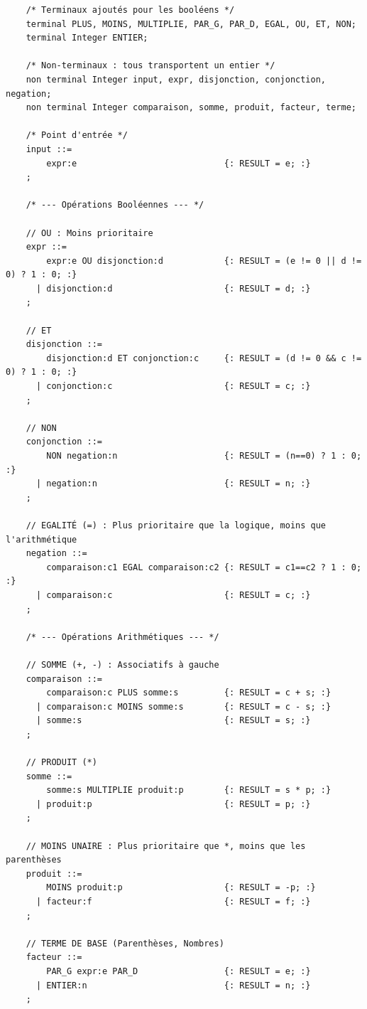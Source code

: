 \documentclass{td}
\begin{document}
\begin{correction}
  \begin{lstlisting}
    /* Terminaux ajoutés pour les booléens */
    terminal PLUS, MOINS, MULTIPLIE, PAR_G, PAR_D, EGAL, OU, ET, NON;
    terminal Integer ENTIER;
     
    /* Non-terminaux : tous transportent un entier */
    non terminal Integer input, expr, disjonction, conjonction, negation;
    non terminal Integer comparaison, somme, produit, facteur, terme;
          
    /* Point d'entrée */
    input ::=
        expr:e                             {: RESULT = e; :}
    ;
     
    /* --- Opérations Booléennes --- */
     
    // OU : Moins prioritaire
    expr ::=
        expr:e OU disjonction:d            {: RESULT = (e != 0 || d != 0) ? 1 : 0; :}
      | disjonction:d                      {: RESULT = d; :}
    ;
     
    // ET
    disjonction ::=
        disjonction:d ET conjonction:c     {: RESULT = (d != 0 && c != 0) ? 1 : 0; :}
      | conjonction:c                      {: RESULT = c; :}
    ;
     
    // NON
    conjonction ::=
        NON negation:n                     {: RESULT = (n==0) ? 1 : 0; :}
      | negation:n                         {: RESULT = n; :}
    ;
     
    // EGALITÉ (=) : Plus prioritaire que la logique, moins que l'arithmétique
    negation ::=
        comparaison:c1 EGAL comparaison:c2 {: RESULT = c1==c2 ? 1 : 0; :}
      | comparaison:c                      {: RESULT = c; :}
    ;
     
    /* --- Opérations Arithmétiques --- */
     
    // SOMME (+, -) : Associatifs à gauche
    comparaison ::=
        comparaison:c PLUS somme:s         {: RESULT = c + s; :}
      | comparaison:c MOINS somme:s        {: RESULT = c - s; :}
      | somme:s                            {: RESULT = s; :}
    ;
     
    // PRODUIT (*)
    somme ::=
        somme:s MULTIPLIE produit:p        {: RESULT = s * p; :}
      | produit:p                          {: RESULT = p; :}
    ;
     
    // MOINS UNAIRE : Plus prioritaire que *, moins que les parenthèses
    produit ::=
        MOINS produit:p                    {: RESULT = -p; :}
      | facteur:f                          {: RESULT = f; :}
    ;
     
    // TERME DE BASE (Parenthèses, Nombres)
    facteur ::=
        PAR_G expr:e PAR_D                 {: RESULT = e; :}
      | ENTIER:n                           {: RESULT = n; :}
    ;
  \end{lstlisting}
\end{correction}
\end{document}

